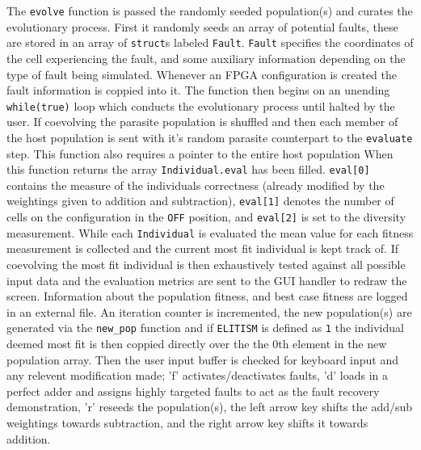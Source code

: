 The \texttt{evolve} function is passed the randomly seeded population(s) and
curates the evolutionary process. First it randomly seeds an array of potential
faults, these are stored in an array of \texttt{struct}s labeled \texttt{Fault}.
\texttt{Fault} specifies the coordinates of the cell experiencing the fault,
and some auxiliary information depending on the type of fault being simulated.
Whenever an FPGA configuration is created the fault information is coppied into it.
The function then begins on an unending \texttt{while(true)} loop which conducts
the evolutionary process until halted by the user. If coevolving the parasite
population is shuffled and then each member of the host population is sent
with it's random parasite counterpart to the \texttt{evaluate} step. This function
also requires a pointer to the entire host population
When this
function returns the array \texttt{Individual.eval} has been filled. \texttt{eval[0]}
contains the measure of the individuals correctness (already modified by the
weightings given to addition and subtraction), \texttt{eval[1]} denotes the number
of cells on the configuration in the \texttt{OFF} position, and \texttt{eval[2]}
is set to the diversity measurement. While each \texttt{Individual} is
evaluated the mean value for each fitness measurement is collected and the current
most fit individual is kept track of. If coevolving the most fit individual is then
exhaustively tested against all possible input data and the evaluation metrics
are sent to the GUI handler to redraw
the screen. Information about the population fitness, and best case fitness are
logged in an external file. An iteration counter is incremented, the new population(s)
are generated via the \texttt{new\_pop} function and if \texttt{ELITISM}
is defined as \texttt{1} the individual deemed most fit is then coppied directly over
the the 0th element in the new population array.
Then the user input buffer is checked for keyboard input and any relevent
modification made;
'f' activates/deactivates faults, 'd' loads in a perfect adder and assigns highly targeted faults
to act as the fault recovery demonstration, 'r' reseeds the population(s), the
left arrow key shifts the add/sub weightings towards subtraction, and the right
arrow key shifts it towards addition.


